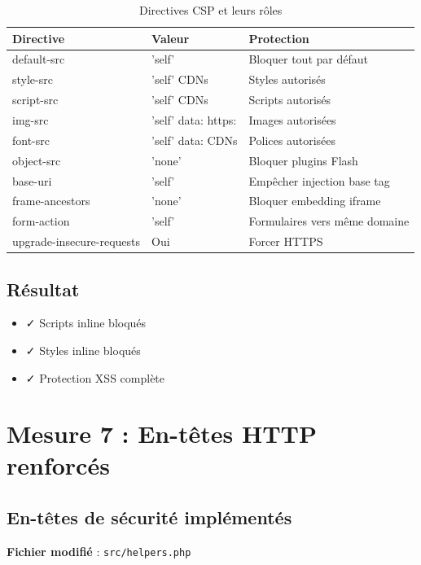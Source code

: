 \documentclass[11pt,a4paper,french]{report}
\begin{document}
\begin{table}[H]
\centering
\caption{Directives CSP et leurs rôles}
\begin{tabular}{|l|p{4cm}|p{3cm}|}
\hline
\textbf{Directive} & \textbf{Valeur} & \textbf{Protection} \\
\hline
default-src & 'self' & Bloquer tout par défaut \\
\hline
style-src & 'self' CDNs & Styles autorisés \\
\hline
script-src & 'self' CDNs & Scripts autorisés \\
\hline
img-src & 'self' data: https: & Images autorisées \\
\hline
font-src & 'self' data: CDNs & Polices autorisées \\
\hline
object-src & 'none' & Bloquer plugins Flash \\
\hline
base-uri & 'self' & Empêcher injection base tag \\
\hline
frame-ancestors & 'none' & Bloquer embedding iframe \\
\hline
form-action & 'self' & Formulaires vers même domaine \\
\hline
upgrade-insecure-requests & Oui & Forcer HTTPS \\
\hline
\end{tabular}
\end{table}

\subsection{Résultat}

\begin{itemize}
    \item ✓ Scripts inline bloqués
    \item ✓ Styles inline bloqués
    \item ✓ Protection XSS complète
\end{itemize}

\newpage

\section{Mesure 7 : En-têtes HTTP renforcés}

\subsection{En-têtes de sécurité implémentés}

\textbf{Fichier modifié} : \texttt{src/helpers.php}
\end{document}
